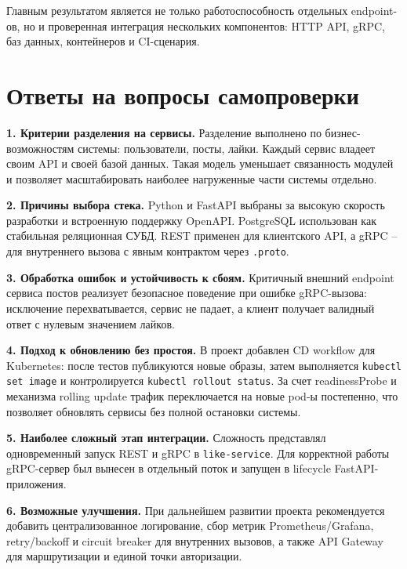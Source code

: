 Главным результатом является не только работоспособность отдельных endpoint-ов, но и проверенная
интеграция нескольких компонентов: HTTP API, gRPC, баз данных, контейнеров и CI-сценария.

\section{Ответы на вопросы самопроверки}

\textbf{1. Критерии разделения на сервисы.}
Разделение выполнено по бизнес-возможностям системы: пользователи, посты, лайки. Каждый сервис
владеет своим API и своей базой данных. Такая модель уменьшает связанность модулей и позволяет
масштабировать наиболее нагруженные части системы отдельно.

\textbf{2. Причины выбора стека.}
Python и FastAPI выбраны за высокую скорость разработки и встроенную поддержку OpenAPI.
PostgreSQL использован как стабильная реляционная СУБД. REST применен для клиентского API, а gRPC
-- для внутреннего вызова с явным контрактом через \texttt{.proto}.

\textbf{3. Обработка ошибок и устойчивость к сбоям.}
Критичный внешний endpoint сервиса постов реализует безопасное поведение при ошибке gRPC-вызова:
исключение перехватывается, сервис не падает, а клиент получает валидный ответ с нулевым
значением лайков.

\textbf{4. Подход к обновлению без простоя.}
В проект добавлен CD workflow для Kubernetes: после тестов публикуются новые образы, затем
выполняется \texttt{kubectl set image} и контролируется \texttt{kubectl rollout status}. За счет
readinessProbe и механизма rolling update трафик переключается на новые pod-ы постепенно, что
позволяет обновлять сервисы без полной остановки системы.

\textbf{5. Наиболее сложный этап интеграции.}
Сложность представлял одновременный запуск REST и gRPC в \texttt{like-service}. Для корректной
работы gRPC-сервер был вынесен в отдельный поток и запущен в lifecycle FastAPI-приложения.

\textbf{6. Возможные улучшения.}
При дальнейшем развитии проекта рекомендуется добавить централизованное логирование, сбор метрик
Prometheus/Grafana, retry/backoff и circuit breaker для внутренних вызовов, а также API Gateway
для маршрутизации и единой точки авторизации.
